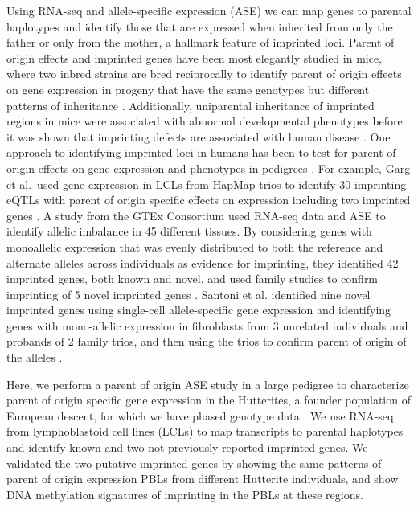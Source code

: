 Using RNA-seq and allele-specific expression (ASE) we can map genes to parental haplotypes and identify those that are expressed when inherited from only the father or only from the mother, a hallmark feature of imprinted loci. Parent of origin effects and imprinted genes have been most elegantly studied in mice, where two inbred strains are bred reciprocally to identify parent of origin effects on gene expression in progeny that have the same genotypes but different patterns of inheritance \cite{Babak2015}. Additionally, uniparental inheritance of imprinted regions in mice were associated with abnormal developmental phenotypes\cite{Cattanach:1985hu} before it was shown that imprinting defects are associated with human disease \cite{Nicholls:vh}. One approach to identifying imprinted loci in humans has been to test for parent of origin effects on gene expression and phenotypes in pedigrees \cite{Kong:2009kk,Benonisdottir:2016dz}. For example, Garg et al.~used gene expression in LCLs from HapMap trios to identify 30 imprinting eQTLs with parent of origin specific effects on expression including two imprinted genes \cite{Garg2012a}. A study from the GTEx Consortium used RNA-seq data and ASE to identify allelic imbalance in 45 different tissues. By considering genes with monoallelic expression that was evenly distributed to both the reference and alternate alleles across individuals as evidence for imprinting, they identified 42 imprinted genes, both known and novel, and used family studies to confirm imprinting of 5 novel imprinted genes \cite{Baran:2015cx}. Santoni et al. identified nine novel imprinted genes using single-cell allele-specific gene expression and identifying genes with mono-allelic expression in fibroblasts from 3 unrelated individuals and probands of 2 family trios, and then using the trios to confirm parent of origin of the alleles \cite{Santoni:2017hu}.

Here, we perform a parent of origin ASE study in a large pedigree to characterize parent of origin specific gene expression in the Hutterites, a founder population of European descent, for which we have phased genotype data \cite{Livne2015}. We use RNA-seq from lymphoblastoid cell lines (LCLs) to map transcripts to parental haplotypes and identify known and two not previously reported imprinted genes. We validated the two putative imprinted genes by showing the same patterns of parent of origin expression PBLs from different Hutterite individuals, and show DNA methylation signatures of imprinting in the PBLs at these regions.
	
